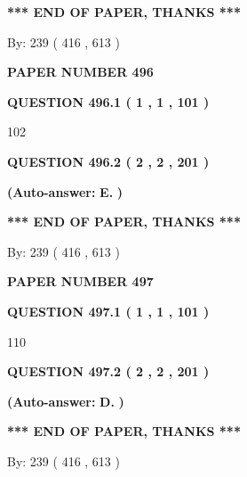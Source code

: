 \documentclass{ctexart}
\begin{document}
 
   
   
   
   
\vspace{1.0in} 
{\textbf{\large{ *** END OF PAPER, THANKS *** }}} 
   
   
\hspace{1.0in} By: 
 239 ( 416 ,  613 )
   
   
   
   
\newpage 
\setcounter{page}{ 
   496001 } 
   
   
 {\textbf{ \Large{ PAPER NUMBER  496  }}}
   
   
   
   
  
  
{\textbf{\large{QUESTION
496.1 
 ( 1 , 1 , 101 )
}}}

102
  
  
{\textbf{\large{QUESTION
496.2 
 ( 2 , 2 , 201 )
}}}
 
 
{\textbf{(Auto-answer:}}
{\textbf{\large{
E.}}}
{\textbf{)}}
 
 
   
   
   
   
\vspace{1.0in} 
{\textbf{\large{ *** END OF PAPER, THANKS *** }}} 
   
   
\hspace{1.0in} By: 
 239 ( 416 ,  613 )
   
   
   
   
\newpage 
\setcounter{page}{ 
   497001 } 
   
   
 {\textbf{ \Large{ PAPER NUMBER  497  }}}
   
   
   
   
  
  
{\textbf{\large{QUESTION
497.1 
 ( 1 , 1 , 101 )
}}}

110
  
  
{\textbf{\large{QUESTION
497.2 
 ( 2 , 2 , 201 )
}}}
 
 
{\textbf{(Auto-answer:}}
{\textbf{\large{
D.}}}
{\textbf{)}}
 
 
   
   
   
   
\vspace{1.0in} 
{\textbf{\large{ *** END OF PAPER, THANKS *** }}} 
   
   
\hspace{1.0in} By: 
 239 ( 416 ,  613 )
   
   
   
   
\newpage 
\setcounter{page}{ 
   498001 } 
   
\end{document}
